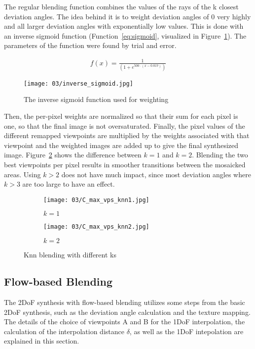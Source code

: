 The regular blending function combines the values of the rays of the k closest deviation angles. The idea behind it is to weight deviation angles of 0 very highly and all larger deviation angles with exponentially low values. This is done with an inverse sigmoid function (Function~\ref{eq:sigmoid}, visualized in Figure~\ref{fig:sigmoid}). The parameters of the function were found by trial and error.

\begin{align}
  f(x) = \frac{1}{(1 + e^{500\cdot(x - 0.017)})} \label{eq:sigmoid}
\end{align}

\begin{figure}
		\centering
		\texttt{[image: 03/inverse\_sigmoid.jpg]}
		\caption{The inverse sigmoid function used for weighting}
		\label{fig:sigmoid}
\end{figure}

Then, the per-pixel weights are normalized so that their sum for each pixel is one, so that the final image is not oversaturated. Finally, the pixel values of the different remapped viewpoints are multiplied by the weights associated with that viewpoint and the weighted images are added up to give the final synthesized image. Figure~\ref{fig:knn} shows the difference between $k=1$ and $k=2$. Blending the two best viewpoints per pixel results in smoother transitions between the mosaicked areas. Using $k>2$ does not have much impact, since most deviation angles where $k>3$ are too large to have an effect.

\begin{figure}
\centering
    \hfill
    \begin{subfigure}[t]{0.5\textwidth}
            \centering
            \texttt{[image: 03/C\_max\_vps\_knn1.jpg]}
            \caption{$k=1$}
    \end{subfigure}%
    \hfill
    \begin{subfigure}[t]{0.5\textwidth}
            \centering
            \texttt{[image: 03/C\_max\_vps\_knn2.jpg]}
            \caption{$k=2$}
    \end{subfigure}
    \hfill
  \caption{Knn blending with different ks} \label{fig:knn}
\end{figure}

\subsection{Flow-based Blending}
The 2DoF synthesis with flow-based blending utilizes some steps from the basic 2DoF synthesis, such as the deviation angle calculation and the texture mapping. The details of the choice of viewpoints A and B for the 1DoF interpolation, the calculation of the interpolation distance $\delta$, as well as the 1DoF intepolation are explained in this section. 

